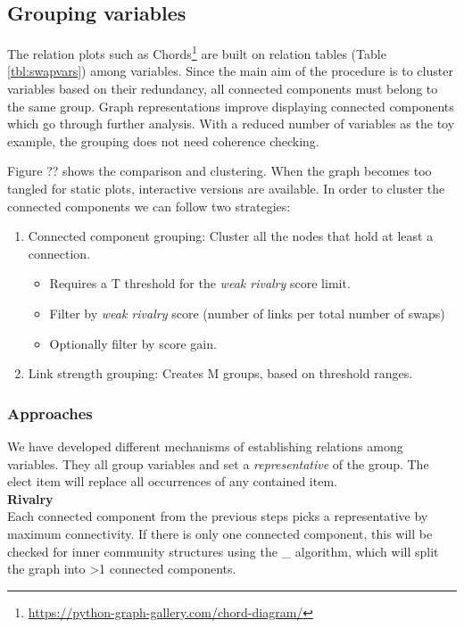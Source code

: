 \subsection{Grouping variables}

The relation plots such as Chords\footnote{\url{https://python-graph-gallery.com/chord-diagram/}} are built on relation tables (Table \ref{tbl:swapvars}) among variables. Since the main aim of the procedure is to cluster variables based on their redundancy, all connected components must belong to the same group.
Graph representations improve displaying connected components which go through further analysis. With a reduced number of variables as the toy example, the grouping does not need coherence checking.

Figure ?? shows the comparison and clustering. When the graph becomes too tangled for static plots, interactive versions are available.
In order to cluster the connected components we can follow two strategies:

\begin{enumerate}
    \item Connected component grouping: Cluster all the nodes that hold at least a connection.
    \begin{itemize}
        \item Requires a T threshold for the \emph{weak rivalry} score limit.
        \item Filter by \emph{weak rivalry} score (number of links per total number of swaps)
        \item Optionally filter by score gain.
    \end{itemize}
    
    \item Link strength grouping: Creates M groups, based on threshold ranges.
\end{enumerate}


\subsubsection{Approaches}
\label{methods:grouping:approaches}
We have developed different mechanisms of establishing relations among variables. They all group variables and set a \textit{representative} of the group. The elect item will replace all occurrences of any contained item.
\\

\textbf{Rivalry}\\
Each connected component from the previous steps picks a representative by maximum connectivity. If there is only one connected component, this will be checked for inner community structures using the \_ algorithm, which will split the graph into >1 connected components.

